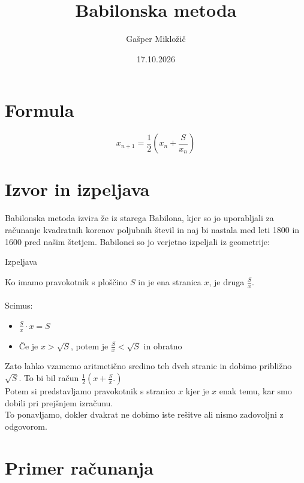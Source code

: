 \documentclass{article}
\title{Babilonska metoda}
\author{Gašper Mikložič}
\date{17.10.2026}
\begin{document}
\maketitle

\section{Formula}

\LARGE
$$x_{n+1}=\dfrac{1}{2}\left( x_n + \dfrac{S}{x_n} \right)$$
\normalsize

\section{Izvor in izpeljava}
Babilonska metoda izvira že iz starega Babilona, kjer so jo uporabljali za računanje kvadratnih korenov poljubnih števil in naj bi nastala med leti 1800 in 1600 pred našim štetjem.
Babilonci so jo verjetno izpeljali iz geometrije:
\begin{defbox}{Izpeljava}
\begin{center}
\end{center}
Ko imamo pravokotnik s ploščino $S$ in je ena stranica $x$, je druga $\frac{S}{x}$.\\\\
Scimus:\\
\begin{itemize}
    \item $\frac{S}{x}\cdot x = S$
    \item Če je $x>\sqrt{S}$, potem je $\frac{S}{x}<\sqrt{S}$ in obratno
\end{itemize}
Zato lahko vzamemo aritmetično sredino teh dveh stranic in dobimo približno $\sqrt{S}$. To bi bil račun $\frac{1}{2}\left(x+\frac{S}{x}.\right)$\\
Potem si predstavljamo pravokotnik s stranico $x$ kjer je $x$ enak temu, kar smo dobili pri prejšnjem izračunu.\\
To ponavljamo, dokler dvakrat ne dobimo iste rešitve ali nismo zadovoljni z odgovorom.
\end{defbox}

\newpage

\section{Primer računanja}
\end{document}

